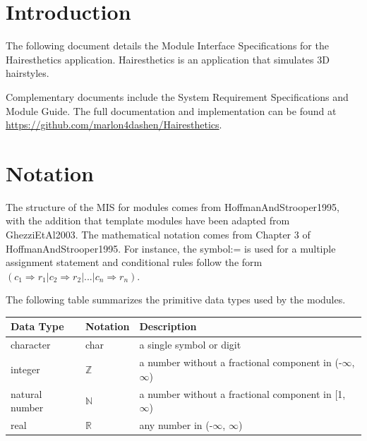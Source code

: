 \documentclass[12pt, titlepage]{article}
\begin{document}
\newpage

\tableofcontents
\listoftables
\listoffigures

\newpage


\section{Introduction}

The following document details the Module Interface Specifications for the Hairesthetics application. Hairesthetics is an application that simulates 3D hairstyles.

Complementary documents include the System Requirement Specifications
and Module Guide.  The full documentation and implementation can be
found at \url{https://github.com/marlon4dashen/Hairesthetics}. 

\section{Notation}

The structure of the MIS for modules comes from HoffmanAndStrooper1995,
with the addition that template modules have been adapted from
GhezziEtAl2003. The mathematical notation comes from Chapter 3 of
HoffmanAndStrooper1995. For instance, the symbol:= is used for a
multiple assignment statement and conditional rules follow the form $(c_1
\Rightarrow r_1 | c_2 \Rightarrow r_2 | ... | c_n \Rightarrow r_n )$.

The following table summarizes the primitive data types used by the modules. 

\begin{center}
\renewcommand{\arraystretch}{1.2}
\noindent 
\begin{tabular}{l l p{7.5cm}} 
\toprule 
\textbf{Data Type} & \textbf{Notation} & \textbf{Description}\\ 
\midrule
character & char & a single symbol or digit\\
integer & $\mathbb{Z}$ & a number without a fractional component in (-$\infty$, $\infty$) \\
natural number & $\mathbb{N}$ & a number without a fractional component in [1, $\infty$) \\
real & $\mathbb{R}$ & any number in (-$\infty$, $\infty$)\\
\bottomrule
\end{tabular} 
\end{center}
\end{document}
